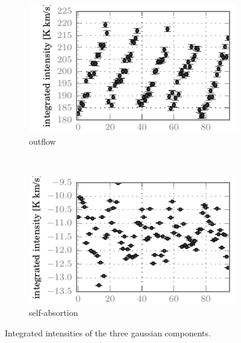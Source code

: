 \begin{figure}[hbtp]
    \begin{subfigure}[b]{0.5\textwidth}
        \includegraphics{co98_outf_iint}
        \caption{ outflow}
    \end{subfigure}%
    \\
    \begin{subfigure}[b]{0.5\textwidth}
        \includegraphics{co87_sabs_iint}
        \caption{ self-absortion}
    \end{subfigure}%
    \hspace{0.5\textwidth}
    \caption{
        Integrated intensities of the three gaussian components.
    }
    \label{fig:fit_iint}
\end{figure}


